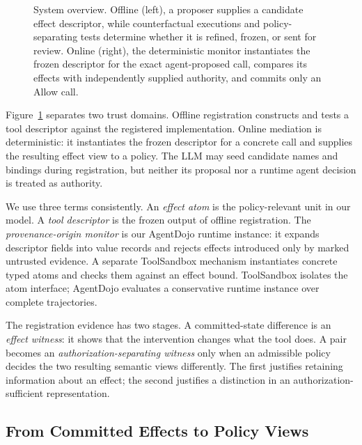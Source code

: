 \documentclass[letterpaper,twocolumn,10pt]{article}
\newcommand{\Deny}{\textnormal{\textsc{Deny}}}
\newcommand{\Abstain}{\textnormal{\textsc{Abstain}}}
\theoremstyle{definition}
\begin{document}
\begin{figure}[t]
\caption{System overview.  Offline (left), a proposer supplies a candidate
effect descriptor, while counterfactual executions and policy-separating tests
determine whether it is refined, frozen, or sent for review.  Online (right),
the deterministic monitor instantiates the frozen descriptor for the exact
agent-proposed call, compares its effects with independently supplied authority,
and commits only an Allow{} call.}
\label{fig:system-overview}
\end{figure}


Figure~\ref{fig:system-overview} separates two trust domains.  Offline
registration constructs and tests a tool descriptor against the registered
implementation.  Online mediation is deterministic: it instantiates the
frozen descriptor for a concrete call and supplies the resulting effect view
to a policy.  The LLM may seed candidate names and bindings during
registration, but neither its proposal nor a runtime agent decision is treated
as authority.

We use three terms consistently.  An \emph{effect atom} is the policy-relevant
unit in our model.  A \emph{tool descriptor} is the frozen output of offline
registration.  The \emph{provenance-origin monitor} is our AgentDojo runtime
instance: it expands descriptor fields into value records and rejects effects
introduced only by marked untrusted evidence.  A separate ToolSandbox
mechanism instantiates concrete typed atoms and checks them against an effect
bound.  ToolSandbox isolates the atom interface; AgentDojo evaluates a
conservative runtime instance over complete trajectories.

The registration evidence has two stages.  A committed-state difference is an
\emph{effect witness}: it shows that the intervention changes what the tool
does.  A pair becomes an \emph{authorization-separating witness} only when an
admissible policy decides the two resulting semantic views differently.  The
first justifies retaining information about an effect; the second justifies a
distinction in an authorization-sufficient representation.

\subsection{From Committed Effects to Policy Views}
\end{document}
